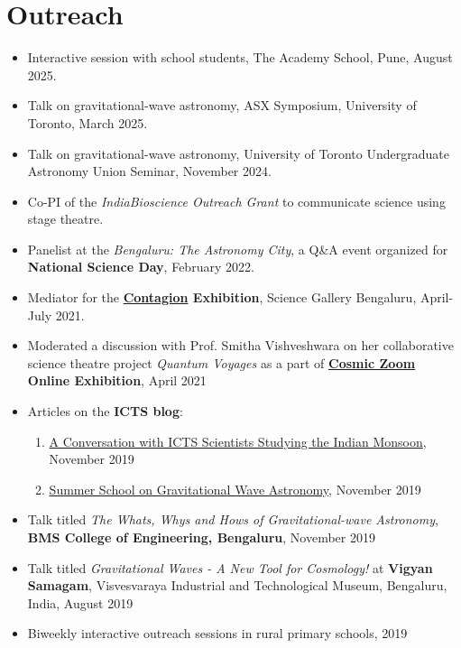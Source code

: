 		\section{Outreach}
		\begin{itemize}[leftmargin=*]
			\item Interactive session with school students, The Academy School, Pune, August 2025.
			\item Talk on gravitational-wave astronomy, ASX Symposium, University of Toronto, March 2025.
			\item Talk on gravitational-wave astronomy, University of Toronto Undergraduate Astronomy Union Seminar, November 2024.
			\item Co-PI of the \textit{IndiaBioscience Outreach Grant} to communicate science using stage theatre.
			\item Panelist at the \textit{Bengaluru: The Astronomy City}, a Q\&A event organized for \textbf{National Science Day}, February 2022.
			\item Mediator for the \textbf{\href{https://bengaluru.sciencegallery.com/contagion-archive}{Contagion} Exhibition}, Science Gallery Bengaluru, April-July 2021.
			\item Moderated a discussion with Prof. Smitha Vishveshwara on her collaborative science theatre project \textit{Quantum Voyages} as a part of \textbf{\href{https://cosmic-zoom.in/}{Cosmic Zoom} Online Exhibition}, April 2021
			\item Articles on the \textbf{ICTS blog}:
			\begin{enumerate}
				\item \href{https://blog.icts.res.in/blog/conversation-icts-scientists-studying-indian-monsoon}{A Conversation with ICTS Scientists Studying the Indian Monsoon}, November 2019
				\item \href{https://blog.icts.res.in/blog/summer-school-gravitational-wave-astronomy}{Summer School on Gravitational Wave Astronomy}, November 2019
			\end{enumerate}	
			\item Talk titled \textit{The Whats, Whys and Hows of Gravitational-wave Astronomy}, \textbf{BMS College of Engineering, Bengaluru}, November 2019
			\item Talk titled \textit{Gravitational Waves - A New Tool for Cosmology!} at \textbf{Vigyan Samagam}, Visvesvaraya Industrial and Technological Museum, Bengaluru, India, August 2019
            \item Biweekly interactive outreach sessions in rural primary schools, 2019	
		\end{itemize}
		
